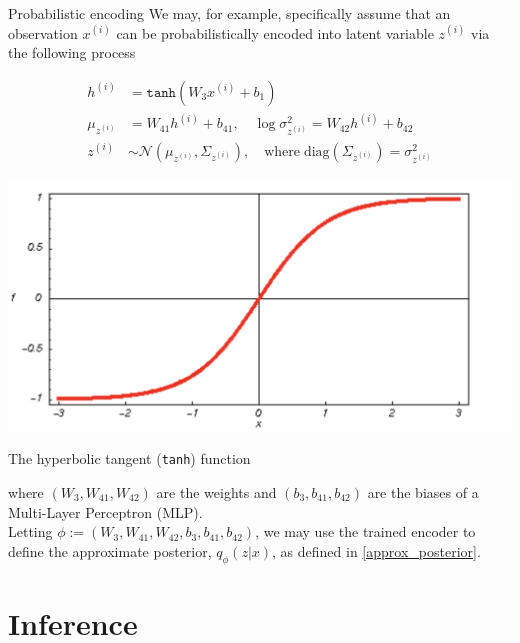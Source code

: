 \documentclass[10pt]{beamer}
\newcommand{\obs}{x^{(i)} }
\newcommand{\alatent}{z^{(i)} }
\newcommand{\N}{\mathcal{N}}
\begin{document}
\begin{frame}{Probabilistic encoding}
\footnotesize
We may, for example, specifically assume that an observation $\obs$ can be probabilistically encoded into latent variable $\alatent$ via the following process

\begin{minipage}{.6\textwidth}
\begin{align*}
h^{(i)} &= \texttt{tanh} (W_3 x^{(i)} + b_1) \\
\mu_{\alatent}&= W_{41} h^{(i)} + b_{41}, \quad \log \sigma^2_{\alatent} = W_{42}h^{(i)}+b_{42} \\
\alatent & \sim \N(\mu_{\alatent}, \Sigma_{\alatent}), \quad \text{where} \; \text{diag}(\Sigma_{\alatent}) = \sigma_{\alatent}^2
\end{align*}
\end{minipage}
\hfill
\begin{minipage}{.3\textwidth}
\begin{center}
\includegraphics[width=.6\textwidth]{images/tanh}

The hyperbolic tangent (\texttt{tanh}) function
\end{center}
\end{minipage}

where $(W_3, W_{41}, W_{42})$ are the weights and $(b_3, b_{41}, b_{42})$ are the biases of a Multi-Layer Perceptron (MLP). \\
\vfill \pause 
Letting $\phi := (W_3, W_{41}, W_{42}, b_3, b_{41}, b_{42})$, we may use the trained encoder to define the approximate posterior, $q_\phi(z| x)$, as defined in \eqref{approx_posterior}.
\end{frame}






\section{Inference}
\end{document}
